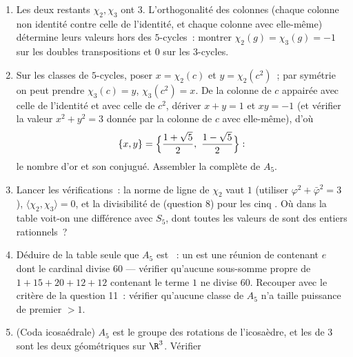 \begin{problem}
\begin{enumerate}[resume]
  \item Les deux  restants $\chi_2, \chi_3$ ont
         $3$. L'orthogonalité des colonnes (chaque colonne
        non identité contre celle de l'identité, et chaque
        colonne avec elle-même) détermine leurs valeurs hors des
        $5$-cycles~: montrer $\chi_2(g) = \chi_3(g) = -1$ sur
        les doubles transpositions et $0$ sur les $3$-cycles.
  \item Sur les classes de $5$-cycles, poser $x = \chi_2(c)$ et
        $y = \chi_2(c^2)$~; par symétrie on peut prendre
        $\chi_3(c) = y$, $\chi_3(c^2) = x$. De la colonne de $c$
        appairée avec celle de l'identité et avec celle de
        $c^2$, dériver $x + y = 1$ et $xy = -1$ (et vérifier la
        valeur $x^2 + y^2 = 3$ donnée par la colonne de $c$
        avec elle-même), d'où
        \[
        \{x, y\} = \Bigl\{\frac{1 + \sqrt5}2,\ \frac{1 -
        \sqrt5}2\Bigr\} :
        \]
        le nombre d'or et son conjugué. Assembler la  complète de $A_5$.
  \item Lancer les vérifications~: la norme de ligne de $\chi_2$
        vaut $1$ (utiliser $\varphi^2 + \bar\varphi^2 = 3$),
        $\langle\chi_2, \chi_3\rangle = 0$, et la divisibilité
        de  (question 8) pour les cinq . Où dans
        la table voit-on une différence avec $S_5$, dont toutes
        les valeurs de  sont des entiers
        rationnels~?
  \item Déduire de la table seule que $A_5$ est ~: un
         est une réunion de  contenant $e$ dont le cardinal divise $60$
        --- vérifier qu'aucune sous-somme propre de $1 + 15 +
        20 + 12 + 12$ contenant le terme $1$ ne divise $60$.
        Recouper avec le critère de la question 11~: vérifier
        qu'aucune classe de $A_5$ n'a taille puissance de
        premier $> 1$.
  \item (Coda icosaédrale) $A_5$ est le groupe des rotations de
        l'icosaèdre, et les  de  $3$ sont
        les deux  géométriques sur $\R^3$. Vérifier

\end{enumerate}
\end{problem}
